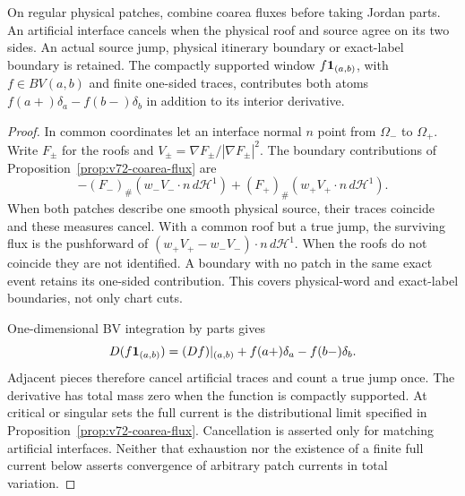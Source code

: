 \begin{proposition}
\label{prop:v73-interface-ledger}
On regular physical patches, combine coarea fluxes before taking
Jordan parts. An artificial interface cancels when the physical
roof and source agree on its two sides. An actual source jump,
physical itinerary boundary or exact-label boundary is retained.
The compactly supported window $f\mathbf1_{(a,b)}$, with $f\in BV(a,b)$
and finite one-sided traces, contributes both atoms
$f(a+)\delta_a-f(b-)\delta_b$ in addition to its interior derivative.
\end{proposition}
\begin{proof}
In common coordinates let an interface normal $n$ point from
$\Omega_-$ to $\Omega_+$. Write $F_\pm$ for the roofs and
$V_\pm=\nabla F_\pm/|\nabla F_\pm|^2$. The boundary contributions
of Proposition~\ref{prop:v72-coarea-flux} are
\[
 -(F_-)_\#(w_-V_-\cdot n\,d\mathcal H^1)
 +(F_+)_\#(w_+V_+\cdot n\,d\mathcal H^1).
\]
When both patches describe one smooth physical source, their traces
coincide and these measures cancel. With a common roof but a true
jump, the surviving flux is the pushforward of
$(w_+V_+-w_-V_-)\cdot n\,d\mathcal H^1$. When the roofs do not
coincide they are not identified. A boundary with no patch in the
same exact event retains its one-sided contribution. This covers
physical-word and exact-label boundaries, not only chart cuts.

One-dimensional BV integration by parts gives
\[
 D(f\mathbf1_{(a,b)})=(Df)|_{(a,b)}+f(a+)\delta_a-f(b-)\delta_b.
\]
Adjacent pieces therefore cancel artificial traces and count a true
jump once. The derivative has total mass zero when the function is
compactly supported. At critical or singular sets the full current
is the distributional limit specified in
Proposition~\ref{prop:v72-coarea-flux}. Cancellation is asserted
only for matching artificial interfaces. Neither that exhaustion nor
the existence of a finite full current below asserts convergence
of arbitrary patch currents in total variation.
\end{proof}
